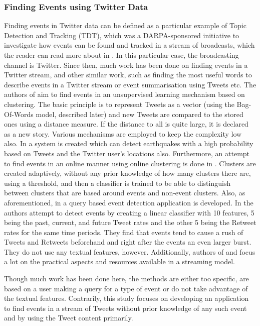 \documentclass[11pt,a4paper]{article}
\begin{document}
\subsubsection{Finding Events using Twitter Data}
Finding events in Twitter data can be defined as a particular example of Topic Detection and Tracking (TDT), which was a DARPA-sponsored initiative to investigate how events can be found and tracked in a stream of broadcasts, which the reader can read more about in \cite{tdt}. In this particular case, the broadcasting channel is Twitter. Since then, much work has been done on finding events in a Twitter stream, and other similar work, such as finding the most useful words to describe events in a Twitter stream or event summarisation using Tweets\cite{eventsummary} etc. 
The authors of \cite{petrovic} aim to find events in an unsupervised learning mechanism based on clustering. The basic principle is to represent Tweets as a vector (using the Bag-Of-Words model, described later) and new Tweets are compared to the stored ones using a distance measure. If the distance to all is quite large, it is declared as a new story. Various mechanisms are employed to keep the complexity low also. In \cite{earthquake} a system is created which can detect earthquakes with a high probability based on Tweets and the Twitter user's locations also. Furthermore, an attempt to find events in an online manner using online clustering is done in \cite{Becker_beyondtrending}. Clusters are created adaptively, without any prior knowledge of how many clusters there are, using a threshold, and then a classifier is trained to be able to distinguish between clusters that are based around events and non-event clusters. Also, as aforementioned, in \cite{microblogs} a query based event detection application is developed. In \cite{eventtwitter} the authors attempt to detect events by creating a linear classifier with 10 features, 5 being the past, current, and future Tweet rates and the other 5 being the Retweet rates for the same time periods. They find that events tend to cause a rush of Tweets and Retweets beforehand and right after the events an even larger burst. They do not use any textual features, however. 
Additionally, authors of \cite{resourceadaptive} and \cite{datastreaming}  focus a lot on the practical aspects and resources available in a streaming model. 

Though much work has been done here, the methods are either too specific\cite{earthquake}, are based on a user making a query for a type of event\cite{microblogs} or do not take advantage of the textual features.\cite{eventtwitter} Contrarily, this study focuses on developing an application to find events in a stream of Tweets without prior knowledge of any such event and by using the Tweet content primarily.
\end{document}
